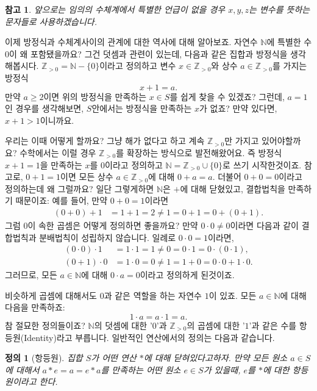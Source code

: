 \documentclass[a4paper, 11pt]{report}
\renewcommand{\<}{\langle}
\renewcommand{\>}{\rangle}
\newtheorem{dfn}[thm]{정의}
\newtheorem{remark}[thm]{참고}
\begin{document}
\begin{remark}
  앞으로는 임의의 수체계에서 특별한 언급이 없을 경우 $x, y, z$는 변수를 뜻하는 문자들로 사용하겠습니다. 
\end{remark}

이제 방정식과 수체계사이의 관계에 대한 역사에 대해 알아보죠. 자연수 $\mathbb{N}$에 특별한 수 $0$이 왜 
포함됐을까요? 그건 덧셈과 관련이 있는데, 다음과 같은 집합과 방정식을 생각해봅시다. $\mathbb{Z}_{>0} = \mathbb{N} - \{0\}$이라고
정의하고 변수 $x \in \mathbb{Z}_{>0}$와 상수 $a \in \mathbb{Z}_{>0}$를 가지는 방정식
$$
x + 1 = a.
$$
만약 $a \ge 2$이면 위의 방정식을 만족하는 $x \in S$를 쉽게 찾을 수 있겠죠? 그런데, $a = 1$인 경우를 생각해보면,
$S$안에서는 방정식을 만족하는 $x$가 없죠? 만약 있다면, $x + 1 > 1$이니까요. 

우리는 이때 어떻게 할까요? 그냥 해가 없다고 하고 계속 $\mathbb{Z}_{>0}$만 가지고 있어야할까요? 
수학에서는 이럴 경우 $\mathbb{Z}_{>0}$를 확장하는 방식으로 발전해왔어요. 즉 방정식 
$x + 1 = 1$을 만족하는 $x$를 $0$이라고 정의하고 $\mathbb{N} = \mathbb{Z}_{>0} \cup \{0\}$로 쓰기 
시작한것이죠. 참고로, $0 + 1 = 1$이면 모든 상수 $a \in \mathbb{Z}_{>0}$에 대해 $0 + a = a$. 
더불어 $0 + 0 = 0$이라고 정의하는데 왜 그럴까요? 일단 그렇게하면 $\mathbb{N}$은 $+$에 대해 닫혔있고, 
결합법칙을 만족하기 때문이죠: 예를 들어, 만약 $0 + 0 = 1$이라면
\begin{align*}
    (0 + 0) + 1 &= 1 + 1 = 2 \neq 1 = 0 + 1 = 0 + (0 + 1).
\end{align*}
그럼 $0$이 속한 곱셈은 어떻게 정의하면 좋을까요? 만약 $0\cdot 0 \neq 0$이라면 다음과 같이 
결합법칙과 분배법칙이 성립하지 않습니다. 일례로 $0 \cdot 0 = 1$이라면,
\begin{align*}
  (0 \cdot 0) \cdot 1 &= 1 \cdot 1 = 1 \neq 0 = 0 \cdot 1 = 0 \cdot (0 \cdot 1),\\
  (0 + 1) \cdot 0 &= 1 \cdot 0 = 0 \neq 1 = 1 + 0 = 0 \cdot 0 + 1 \cdot 0.
\end{align*}
그러므로, 모든 $a \in \mathbb{N}$에 대해 $0\cdot a = 0$이라고 정의하게 된것이죠.

비슷하게 곱셈에 대해서도 $0$과 같은 역할을 하는 자연수 $1$이 있죠. 모든 $a \in \mathbb{N}$에 대해 다음을
만족하죠:
$$
1\cdot a = a \cdot 1 = a.
$$
참 절묘한 정의들이죠? $\mathbb{N}$의 덧셈에 대한 '$0$'과 $\mathbb{Z}_{>0}$의 
곱셈에 대한 '$1$'과 같은 수를 항등원(Identity)라고 부릅니다. 일반적인 연산에서의 정의는 다음과 같습니다.

\begin{dfn}[항등원] 집합 $S$가 어떤 연산 $*$에 대해 닫혀있다고하자. 만약 모든 원소 $a \in S$에 대해서
  $a*e = a = e*a$를 만족하는 어떤 원소 $e \in S$가 있을때, $e$를 $*$에 대한 항등원이라고 한다.
\end{dfn}
\end{document}
